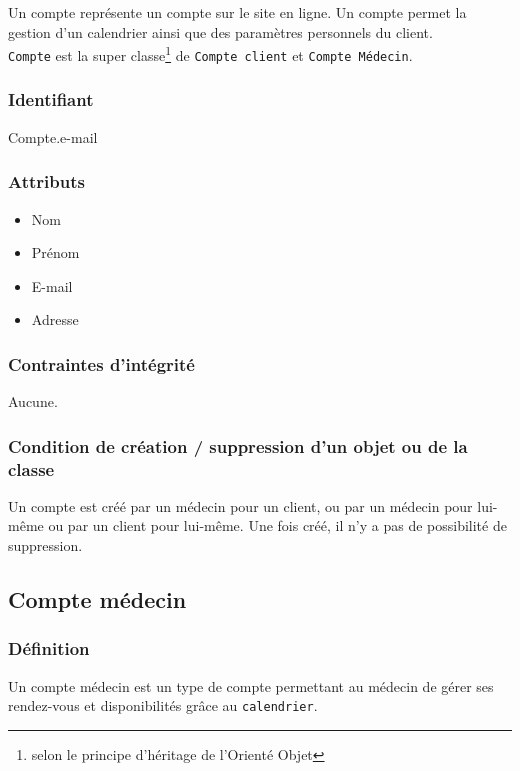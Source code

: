 Un compte représente un compte sur le site en ligne. Un compte permet la gestion 
d'un calendrier ainsi que des paramètres personnels du client. \\
\texttt{Compte} est la super classe\footnote{selon le principe d'héritage de
l'Orienté Objet} de \texttt{Compte client} et \texttt{Compte Médecin}. 

\subsubsection{Identifiant}

Compte.e-mail

\subsubsection{Attributs}

\begin{itemize}
    \item Nom
    \item Prénom
    \item E-mail
    \item Adresse
\end{itemize}

\subsubsection{Contraintes d'intégrité}

Aucune.

\subsubsection{Condition de création / suppression d'un objet ou de la classe}

Un compte est créé par un médecin pour un client, ou par un médecin pour lui-même
ou par un client pour lui-même.
Une fois créé, il n'y a pas de possibilité de suppression.


\subsection{Compte médecin}

\subsubsection{Définition}

Un compte médecin est un type de compte permettant au médecin de gérer ses rendez-vous et disponibilités
grâce au \texttt{calendrier}.

